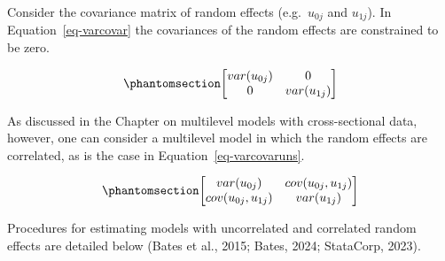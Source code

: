 \documentclass[
  letterpaper,
  DIV=11,
  numbers=noendperiod]{scrreprt}
\begin{document}
Consider the covariance matrix of random effects (e.g.~\(u_{0j}\) and
\(u_{1j}\)). In Equation~\ref{eq-varcovar} the covariances of the random
effects are constrained to be zero.

\begin{equation}\phantomsection\label{eq-varcovar}{\begin{bmatrix}
var(u_{0j}) & 0 \\
0 & var(u_{1j}) 
\end{bmatrix}}\end{equation}

As discussed in the Chapter on multilevel models with cross-sectional
data, however, one can consider a multilevel model in which the random
effects are correlated, as is the case in Equation~\ref{eq-varcovaruns}.

\begin{equation}\phantomsection\label{eq-varcovaruns}{\begin{bmatrix}
var(u_{0j}) & cov(u_{0j}, u_{1j}) \\
cov(u_{0j}, u_{1j}) & var(u_{1j}) 
\end{bmatrix}}\end{equation}

Procedures for estimating models with uncorrelated and correlated random
effects are detailed below (Bates et al., 2015; Bates, 2024; StataCorp,
2023).
\end{document}
